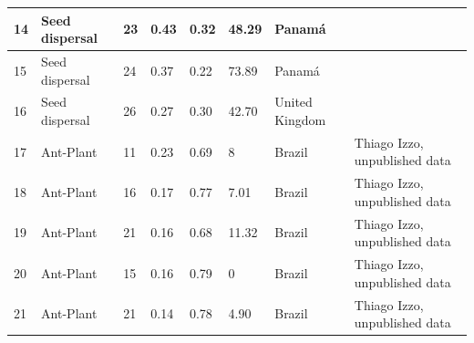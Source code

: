 \documentclass[a4paper, 12pt]{article}
\begin{document}
\begin{table}[H]
\begin{adjustbox}{width=\columnwidth,center}
{\begin{tabular}{|l|l|l|l|l|l|l|l|}
14                                 & Seed dispersal                     & 23                              & 0.43                            & 0.32                            & 48.29                              & Panamá                                 & \textcite{poulin_interspecific_1999}                              \\ \hline
15                                 & Seed dispersal                     & 24                              & 0.37                            & 0.22                            & 73.89                              & Panamá                                 &\textcite{poulin_interspecific_1999}                              \\ \hline
16                                 & Seed dispersal                     & 26                              & 0.27                            & 0.30                            & 42.70                              & United Kingdom                         & \cite{sorensen_interactions_1981}                                   \\ \hline
17                                 & Ant-Plant                          & 11                              & 0.23                            & 0.69                            & 8                                  & Brazil                                 & Thiago Izzo, unpublished data                   \\ \hline
18                                 & Ant-Plant                          & 16                              & 0.17                            & 0.77                            & 7.01                               & Brazil                                 & Thiago Izzo, unpublished data                   \\ \hline
19                                 & Ant-Plant                          & 21                              & 0.16                            & 0.68                            & 11.32                              & Brazil                                 & Thiago Izzo, unpublished data                   \\ \hline
20                                 & Ant-Plant                          & 15                              & 0.16                            & 0.79                            & 0                                  & Brazil                                 & Thiago Izzo, unpublished data                   \\ \hline
21                                 & Ant-Plant                          & 21                              & 0.14                            & 0.78                            & 4.90                               & Brazil                                 & Thiago Izzo, unpublished data                   \\ \hline

\end{tabular}}
\end{adjustbox}
\end{table}
\end{document}
